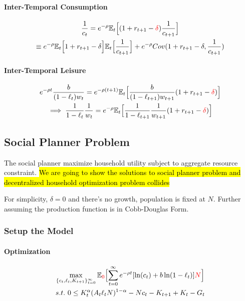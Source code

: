 \documentclass[11pt]{article}
\newcommand{\expat}[2]{\mathbb{E}_{#1}\Big[{#2}\Big]}
\begin{document}
			\paragraph{Inter-Temporal Consumption}
			\begin{gather}
				\frac{1}{c_t} = e^{-\rho} \expat{t}{(1 + r_{t+1} - \textcolor{red}{\delta})\frac{1}{c_{t+1}}} \\
				\equiv e^{-\rho} \expat{t}{1+r_{t+1}-\delta}\expat{t}{\frac{1}{c_{t+1}}} + e^{-\rho} Cov(1+r_{t+1}-\delta, \frac{1}{c_{t+1}})
			\end{gather}
			
			\paragraph{Inter-Temporal Leisure}
			\begin{gather}
				e^{-\rho t} \frac{b}{(1-\ell_t) w_t} = e^{-\rho (t+1)} \expat{t}{\frac{b}{(1-\ell_{t+1})w_{t+1}} (1 + r_{t+1} - \textcolor{red}{\delta})} \\
				\implies \frac{1}{1-\ell_t} \frac{1}{w_t} = e^{-\rho} \expat{t}{\frac{1}{1-\ell_{t+1}}\frac{1}{w_{t+1}} (1 + r_{t+1} - \textcolor{red}{\delta})}
			\end{gather}
		\subsection{Social Planner Problem}
			\par The social planner maximize household utility subject to aggregate resource constraint. \hl{We are going to show the solutions to social planner problem and decentralized household optimization problem collides }
			\begin{assumption}
				For simplicity, $\delta=0$ and there's no growth, population is fixed at $N$. Further assuming the production function is in Cobb-Douglas Form.
			\end{assumption}
		\subsubsection{Setup the Model}
			\paragraph{Optimization}
			\begin{gather}
				\max_{\{c_t, \ell_t, K_{t+1}\}_{t=0}^\infty} \expat{\textcolor{red}{0}}{\sum_{t=0}^\infty e^{-\rho t} [\ln(c_t) + b \ln(1-\ell_t)]\textcolor{red}{N}} \\
				s.t.\ 0 \leq K_t^\alpha (A_t \ell_t N)^{1-\alpha} - Nc_t - K_{t+1} + K_t - G_t
			\end{gather}
\end{document}
